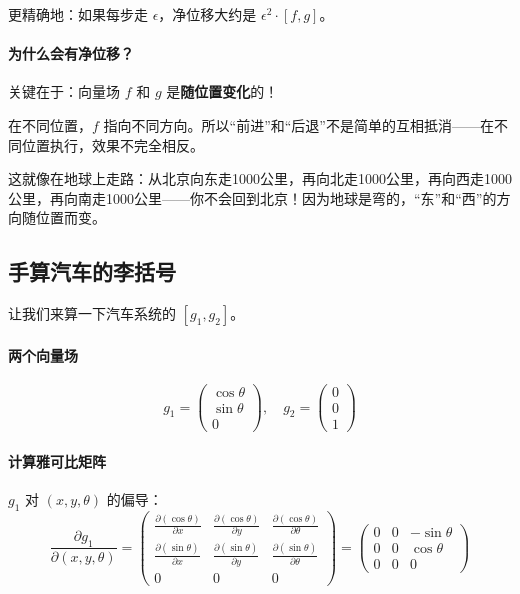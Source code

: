 更精确地：如果每步走 $\epsilon$，净位移大约是 $\epsilon^2 \cdot [f, g]$。

\paragraph{为什么会有净位移？}

关键在于：向量场 $f$ 和 $g$ 是\textbf{随位置变化}的！

在不同位置，$f$ 指向不同方向。所以“前进”和“后退”不是简单的互相抵消——在不同位置执行，效果不完全相反。

这就像在地球上走路：从北京向东走1000公里，再向北走1000公里，再向西走1000公里，再向南走1000公里——你不会回到北京！因为地球是弯的，“东”和“西”的方向随位置而变。

\subsection*{手算汽车的李括号}

让我们来算一下汽车系统的 $[g_1, g_2]$。

\paragraph{两个向量场}

\begin{equation}
g_1 = \begin{pmatrix} \cos\theta \\ \sin\theta \\ 0 \end{pmatrix}, \quad
g_2 = \begin{pmatrix} 0 \\ 0 \\ 1 \end{pmatrix}
\end{equation}

\paragraph{计算雅可比矩阵}

$g_1$ 对 $(x, y, \theta)$ 的偏导：
\begin{equation}
\frac{\partial g_1}{\partial (x, y, \theta)} = \begin{pmatrix} 
\frac{\partial (\cos\theta)}{\partial x} & \frac{\partial (\cos\theta)}{\partial y} & \frac{\partial (\cos\theta)}{\partial \theta} \\
\frac{\partial (\sin\theta)}{\partial x} & \frac{\partial (\sin\theta)}{\partial y} & \frac{\partial (\sin\theta)}{\partial \theta} \\
0 & 0 & 0
\end{pmatrix} = \begin{pmatrix} 0 & 0 & -\sin\theta \\ 0 & 0 & \cos\theta \\ 0 & 0 & 0 \end{pmatrix}
\end{equation}

